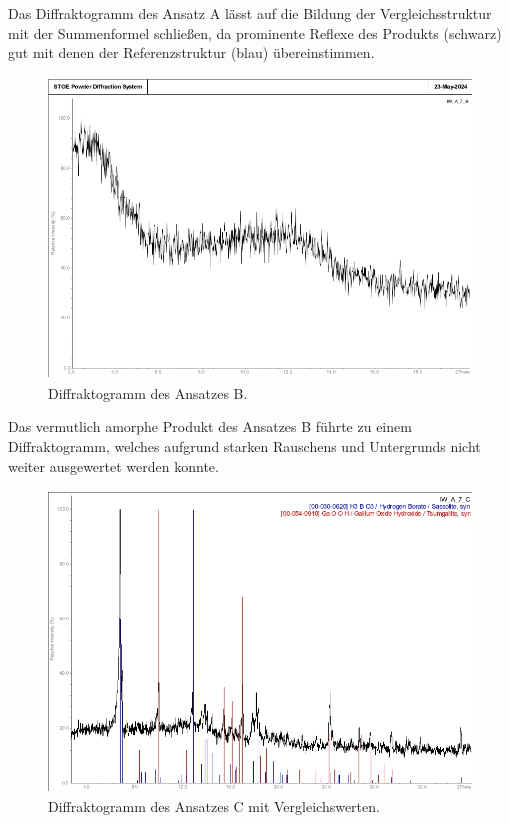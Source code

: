 \documentclass[12pt]{article}
\begin{document}
\noindent Das Diffraktogramm des Ansatz A lässt auf die Bildung der Vergleichsstruktur mit der Summenformel  schließen, da prominente Reflexe des Produkts (schwarz) gut mit denen der Referenzstruktur (blau) übereinstimmen.

\begin{figure}[H]
    \centering
    \includegraphics[height=8cm]{Images/AutoklaveB.jpeg}
    \caption{Diffraktogramm des Ansatzes B.}
    \label{fig:4}
\end{figure}

\noindent Das vermutlich amorphe Produkt des Ansatzes B führte zu einem Diffraktogramm, welches aufgrund starken Rauschens und Untergrunds nicht weiter ausgewertet werden konnte.

\begin{figure}[H]
    \centering
    \includegraphics[height=8cm]{Images/AutoklaveC.jpeg}
    \caption{Diffraktogramm des Ansatzes C mit Vergleichswerten.}
    \label{fig:5}
\end{figure}
\end{document}
